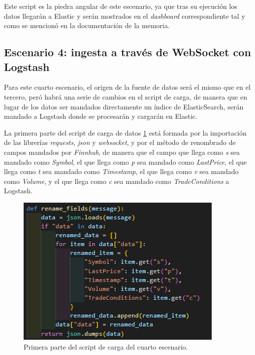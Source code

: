 Este script es la piedra angular de este escenario, ya que tras su ejecución los datos llegarán a Elastic y serán mostrados en el \textit{dashboard} correspondiente tal y como se mencionó en la documentación de la memoria.

\subsection{Escenario 4: ingesta a través de WebSocket con Logstash}

Para este cuarto escenario, el origen de la fuente de datos será el mismo que en el tercero, peró habrá una serie de cambios en el script de carga, de manera que en lugar de los datos ser mandados directamente un índice de ElasticSearch, serán mandado a Logstash donde se procesarán y cargarán en Elastic.

La primera parte del script de carga de datos \ref{fig:escenario41} está formada por la importación de las librerías \textit{requests}, \textit{json} y \textit{websocket}, y por el método de renombrado de campos mandados por \textit{Finnhub}, de manera que el campo que llega como \textit{s} sea mandado como \textit{Symbol}, el que llega como \textit{p} sea mandado como \textit{LastPrice}, el que llega como \textit{t} sea mandado como \textit{Timestamp}, el que llega como \textit{v} sea mandado como \textit{Volume}, y el que llega como \textit{c} sea mandado como \textit{TradeConditions} a Logstash.

\begin{figure}
    \centering
    \includegraphics[width=1\linewidth]{img/websocket1.png}
    \caption{Primera parte del script de carga del cuarto escenario.}
    \label{fig:escenario41}
\end{figure}

